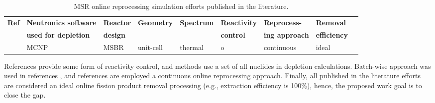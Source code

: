 \FloatBarrier
\begin{sidewaystable}
	\centering
	\caption{\gls{MSR} online reprocessing simulation efforts published in 
	the literature.} 
	\vspace{1ex}
\begin{tabularx}{\textwidth}{a p{0.2\textwidth} x x x x x x x}
	\hline
	\textbf{Ref}  & \textbf{Neutronics software} & \textbf{Reactor} & \textbf{Geometry} & \textbf{Spectrum} &	\textbf{Reactivity} &\textbf{Reprocess-} &\textbf{Removal} \\
	 & \textbf{used for depletion} & \textbf{design} & & & \textbf{control} & \textbf{ing approach} & \textbf{efficiency} \\
	\hline
	\cite{nuttin_potential_2005}&\gls{MCNP}\cite{noauthor_mcnp_2004}&MSBR&unit-cell&thermal&o&continuous&ideal\\
	\hline	
\end{tabularx}
\label{tab:table2}
\end{sidewaystable}

References \cite{li_optimization_2018,de_troullioud_de_lanversin_toward_2017,doligez_coupled_2014,
heuer_towards_2014, sheu_depletion_2013, aufiero_extended_2013} provide some form of reactivity control, 
and methods \cite{doligez_coupled_2014,heuer_towards_2014,aufiero_extended_2013,ahmad_neutronics_2015, 
park_whole_2015,jeong_equilibrium_2016,rykhlevskii_modeling_2019,nuttin_potential_2005} use a set of all nuclides in depletion calculations. Batch-wise approach was used in 
references \cite{powers_new_2013,powers_inventory_2014,betzler_molten_2017, 
li_optimization_2018, park_whole_2015, jeong_equilibrium_2016,
rykhlevskii_advanced_2018, rykhlevskii_modeling_2019},
and references \cite{nuttin_potential_2005,doligez_coupled_2014,
heuer_towards_2014, fiorina_preliminary_2012-1, sheu_depletion_2013,
aufiero_extended_2013, zhou_fuel_2018-1, ahmad_neutronics_2015,
de_troullioud_de_lanversin_toward_2017} are employed a continuous online 
reprocessing approach. Finally, all published in the literature efforts 
are considered an ideal online fission product removal processing  (e.g., 
extraction efficiency is 100\%), hence, the proposed work goal is 
to close the gap.


